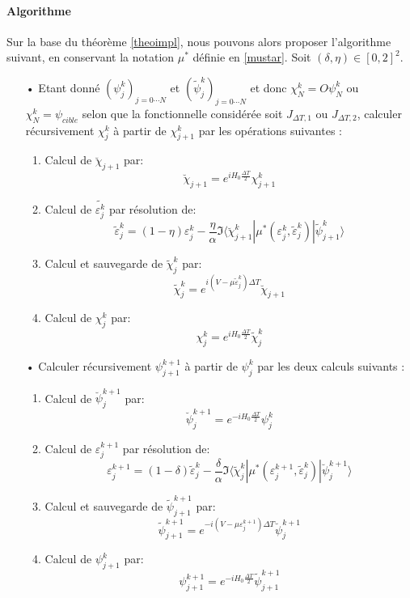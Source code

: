 \paragraph*{Algorithme}
$ $\\Sur la base du théorème \ref{theoimpl}, nous pouvons alors proposer l'algorithme suivant, en conservant la notation $\mu^*$ définie en \ref{mustar}. Soit $(\delta, \eta) \in [0, 2]^2$.

\begin{itemize}
	
	\item[•] Etant donné $ (\psi^k_j)_{j=0\cdots N}$ et $ (\tilde{\psi}^k_j)_{j=0\cdots N}$ et donc $\chi^k_N = O\psi^k_N$ ou $ \chi_N^k = \psi_{cible} $ selon que la
	fonctionnelle considérée soit $J_{\Delta T,1}$ ou $J_{\Delta T,2}$, calculer récursivement $\chi_j^k$ à partir de $ \chi^k_{j+1} $ par les opérations suivantes :
	
	\begin{enumerate}
		\item Calcul de $\breve{\chi}_{j+1}$ par:
		$$ \breve{\chi}_{j+1} = e^{iH_0\frac{\Delta T}{2}} \chi^k_{j+1} $$
		\item Calcul de $\tilde{\varepsilon_j^k}$ par résolution de:
		\begin{equation} \label{implepst}
		\tilde{\varepsilon}_j^k = (1-\eta)\varepsilon^k_j - \frac{\eta}{\alpha}\Im \langle  \breve{\chi}^k_{j+1}|\mu^*(\varepsilon^k_j,\tilde{\varepsilon}^k_j)|\tilde{\psi}^k_{j+1} \rangle
		\end{equation}
		\item Calcul et sauvegarde de $\tilde{\chi}^k_j$ par:
		$$ \tilde{\chi}^k_j = e^{i(V-\mu \tilde{\varepsilon}^k_j)\Delta T} \breve{\chi}_{j+1} $$
		\item Calcul de $\chi^k_j$ par:
		$$ \chi^k_j = e^{iH_0\frac{\Delta T}{2}} \tilde{\chi}_j^k  $$
	\end{enumerate}
	
	\item[•] Calculer récursivement $ \psi^{k+1}_{j+1}$ à partir de $\psi_j^k$ par les deux calculs suivants :
	
	\begin{enumerate}
		\item Calcul de $\breve{\psi}_j^{k+1}$ par:
		$$ \breve{\psi}_j^{k+1} = e^{-iH_0\frac{\Delta T}{2}} \psi^k_j $$
		\item Calcul de $\varepsilon_j^{k+1}$ par résolution de:
		\begin{equation} \label{impleps}
		\varepsilon_j^{k+1} = (1-\delta)\tilde{\varepsilon}^k_j - \frac{\delta}{\alpha}\Im \langle  \tilde{\chi}^k_{j}|\mu^*(\varepsilon^{k+1}_j,\tilde{\varepsilon}^k_j)|\breve{\psi}^{k+1}_{j} \rangle
		\end{equation}
		\item Calcul et sauvegarde de $\tilde{\psi}^{k+1}_{j+1}$ par:
		$$ \tilde{\psi}^{k+1}_{j+1} = e^{-i(V-\mu \varepsilon_j^{k+1})\Delta T} \breve{\psi}_j^{k+1}  $$
		\item Calcul de $\psi^k_{j+1}$ par:
		$$ \psi^{k+1}_{j+1} = e^{-iH_0\frac{\Delta T}{2}} \tilde{\psi}^{k+1}_{j+1} $$
		

\end{enumerate}
\end{itemize}

